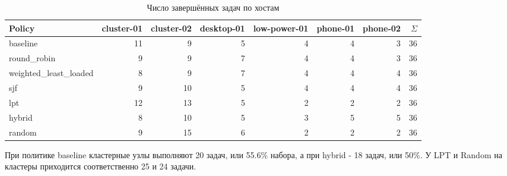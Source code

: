 \documentclass[a4paper,12pt]{extarticle}
\begin{document}
\begin{table}[H]
    \centering
    \caption{Число завершённых задач по хостам}
    \scriptsize
    \begin{tabular}{lrrrrrrr}
        \toprule
        Policy & cluster-01 & cluster-02 & desktop-01 & low-power-01 & phone-01 & phone-02 & $\Sigma$ \\
        \midrule
            baseline & 11 & 9 & 5 & 4 & 4 & 3 & 36 \\
            round\_robin & 9 & 9 & 7 & 4 & 4 & 3 & 36 \\
            weighted\_least\_loaded & 8 & 9 & 7 & 4 & 4 & 4 & 36 \\
            sjf & 9 & 10 & 5 & 4 & 4 & 4 & 36 \\
            lpt & 12 & 13 & 5 & 2 & 2 & 2 & 36 \\
            hybrid & 8 & 10 & 5 & 3 & 5 & 5 & 36 \\
            random & 9 & 15 & 6 & 2 & 2 & 2 & 36 \\
        \bottomrule
    \end{tabular}
\end{table}

При политике baseline кластерные узлы выполняют 20 задач, или 55.6\% набора, а при hybrid - 18 задач, или 50\%. У LPT и Random на кластеры приходится соответственно 25 и 24 задачи.
\end{document}

